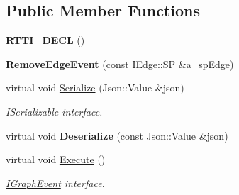 \subsection*{Public Member Functions}
\begin{DoxyCompactItemize}
\item 
\mbox{\label{struct_graph_connector_1_1_remove_edge_event_ac5d3a6f6678b214c40ea403a69849128}} 
{\bfseries R\+T\+T\+I\+\_\+\+D\+E\+CL} ()
\item 
\mbox{\label{struct_graph_connector_1_1_remove_edge_event_ae88788c4f4a8f99e5b176bc0403df9d4}} 
{\bfseries Remove\+Edge\+Event} (const \hyperlink{class_i_graph_1_1_i_edge_adfae3ec3e377543685a06b9c5d5a776a}{I\+Edge\+::\+SP} \&a\+\_\+sp\+Edge)
\item 
\mbox{\label{struct_graph_connector_1_1_remove_edge_event_a6b2f7d1084538c477d615cc60c541676}} 
virtual void \hyperlink{struct_graph_connector_1_1_remove_edge_event_a6b2f7d1084538c477d615cc60c541676}{Serialize} (Json\+::\+Value \&json)
\begin{DoxyCompactList}\small\item\em I\+Serializable interface. \end{DoxyCompactList}\item 
\mbox{\label{struct_graph_connector_1_1_remove_edge_event_a48b6a015afc0cedb9543f77e35e380d2}} 
virtual void {\bfseries Deserialize} (const Json\+::\+Value \&json)
\item 
\mbox{\label{struct_graph_connector_1_1_remove_edge_event_ad6c5e045cce7376994a5e0c1d90d1ff1}} 
virtual void \hyperlink{struct_graph_connector_1_1_remove_edge_event_ad6c5e045cce7376994a5e0c1d90d1ff1}{Execute} ()
\begin{DoxyCompactList}\small\item\em \hyperlink{struct_graph_connector_1_1_i_graph_event}{I\+Graph\+Event} interface. \end{DoxyCompactList}\end{DoxyCompactItemize}
